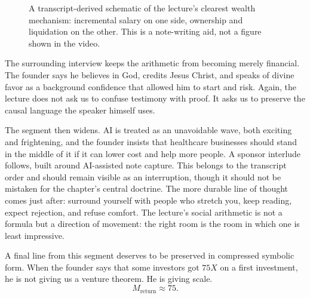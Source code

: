 \begin{figure}
\centering
{}
\caption{A transcript-derived schematic of the lecture's clearest wealth mechanism: incremental salary on one side, ownership and liquidation on the other. This is a note-writing aid, not a figure shown in the video.}
\end{figure}

The surrounding interview keeps the arithmetic from becoming merely financial. The founder says he believes in God, credits Jesus Christ, and speaks of divine favor as a background confidence that allowed him to start and risk. Again, the lecture does not ask us to confuse testimony with proof. It asks us to preserve the causal language the speaker himself uses.

The segment then widens. AI is treated as an unavoidable wave, both exciting and frightening, and the founder insists that healthcare businesses should stand in the middle of it if it can lower cost and help more people. A sponsor interlude follows, built around AI-assisted note capture. This belongs to the transcript order and should remain visible as an interruption, though it should not be mistaken for the chapter's central doctrine. The more durable line of thought comes just after: surround yourself with people who stretch you, keep reading, expect rejection, and refuse comfort. The lecture's social arithmetic is not a formula but a direction of movement: the right room is the room in which one is least impressive.

A final line from this segment deserves to be preserved in compressed symbolic form. When the founder says that some investors got \(75X\) on a first investment, he is not giving us a venture theorem. He is giving scale.
\begin{equation}
M_{\text{return}} \approx 75.
\end{equation}

